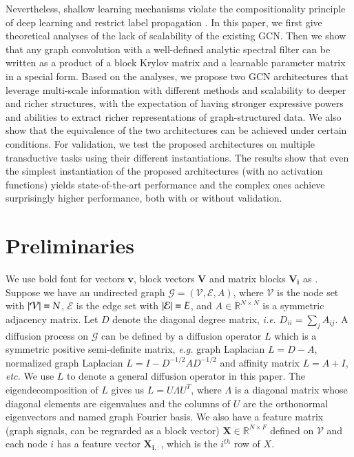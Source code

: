 \documentclass{article}
\newcommand\ie{\textit{i.e.}}
\newcommand\eg{\textit{e.g.}}
\newcommand\etc{\textit{etc.}}
\begin{document}
\par
Nevertheless, shallow learning mechanisms violate the compositionality principle of deep learning \cite{lecun2015deep, hinton2006fast} and restrict label propagation \cite{sun2019stage}. In this paper, we first give theoretical analyses of the lack of scalability of the existing GCN. Then we show that any graph convolution with a well-defined analytic spectral filter can be written as a product of a block Krylov matrix and a learnable parameter matrix in a special form. Based on the analyses, we propose two GCN architectures that leverage multi-scale information with different methods and scalability to deeper and richer structures, with the expectation of having stronger expressive powers and abilities to extract richer representations of graph-structured data. We also show that the equivalence of the two architectures can be achieved under certain conditions. For validation, we test the proposed architectures on multiple transductive tasks using their different instantiations. The results show that even the simplest instantiation of the proposed architectures (with no activation functions) yields state-of-the-art performance and the complex ones achieve surprisingly higher performance, both with or without validation.

\section{Preliminaries}
\label{sec:preliminaries}
We use bold font for vectors $\bm{v}$, block vectors $\bm{V}$ and matrix blocks $\bm{V_i}$ as \cite{frommer2017block}. Suppose we have an undirected graph $\mathcal{G}=(\mathcal{V},\mathcal{E}, A)$, where $\mathcal{V}$ is the node set with $\abs{\mathcal{V}}=N$, $\mathcal{E}$ is the edge set with $\abs{\mathcal{E}}=E$, and $A \in \mathbb{R}^{N\times N}$ is a symmetric adjacency matrix. Let $D$ denote the diagonal degree matrix, \ie{} $D_{ii} = \sum_j A_{ij}$. A diffusion process on $\mathcal{G}$ can be defined by a diffusion operator $L$ \cite{coifman2006diffusion, coifman2006diffusionmaps} which is a symmetric positive semi-definite matrix, \eg{} graph Laplacian $L=D-A$, normalized graph Laplacian $L=I-D^{-1/2} A D^{-1/2}$ and affinity matrix $L = A + I$, \etc{} We use $L$ to denote a general diffusion operator in this paper. The eigendecomposition of $L$ gives us $L=U \Lambda U^T$, where $\Lambda$ is a diagonal matrix whose diagonal elements are eigenvalues and the columns of $U$ are the orthonormal eigenvectors and named graph Fourier basis. We also have a feature matrix (graph signals, can be regrarded as a block vector) $\bm{X} \in \mathbb{R}^{N\times F}$ defined on $\mathcal{V}$ and each node $i$ has a feature vector $\bm{X_{i,:}}$, which is the $i^{th}$ row of $X$.
\end{document}
